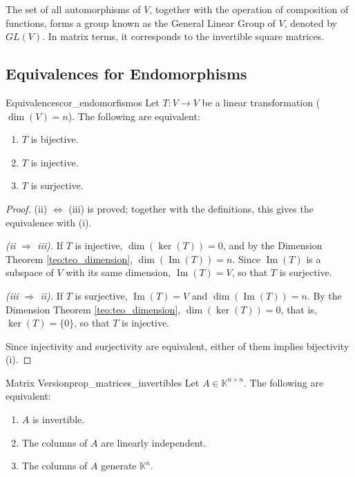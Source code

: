 \documentclass[11pt, a4paper]{article}
\begin{document}
\obs The set of all automorphisms of $V$, together with the operation of composition of functions, forms a group known as the General Linear Group of $V$, denoted by $GL(V)$. In matrix terms, it corresponds to the invertible square matrices.

\subsection{Equivalences for Endomorphisms}

\begin{corolario}{Equivalences}{cor_endomorfismos}
Let $T: V \to V$ be a linear transformation ($\dim(V)=n$). The following are equivalent:
\begin{enumerate}
    \item[(i)] $T$ is bijective.
    \item[(ii)] $T$ is injective.
    \item[(iii)] $T$ is surjective.
\end{enumerate}
\end{corolario}

\begin{proof}
(ii) $\Leftrightarrow$ (iii) is proved; together with the definitions, this gives the equivalence with (i).

\textit{(ii $\Rightarrow$ iii).} If $T$ is injective, $\dim(\ker(T)) = 0$, and by the Dimension Theorem \ref{teo:teo_dimension}, $\dim(\operatorname{Im}(T)) = n$. Since $\operatorname{Im}(T)$ is a subspace of $V$ with its same dimension, $\operatorname{Im}(T) = V$, so that $T$ is surjective.

\textit{(iii $\Rightarrow$ ii).} If $T$ is surjective, $\operatorname{Im}(T) = V$ and $\dim(\operatorname{Im}(T)) = n$. By the Dimension Theorem \ref{teo:teo_dimension}, $\dim(\ker(T)) = 0$, that is, $\ker(T) = \{0\}$, so that $T$ is injective.

Since injectivity and surjectivity are equivalent, either of them implies bijectivity (i).
\end{proof}

\begin{proposicion}{Matrix Version}{prop_matrices_invertibles}
Let $A \in \mathbb{K}^{n \times n}$. The following are equivalent:
\begin{enumerate}
    \item $A$ is invertible.
    \item The columns of $A$ are linearly independent.
    \item The columns of $A$ generate $\mathbb{K}^n$.
\end{enumerate}
\end{proposicion}
\end{document}
